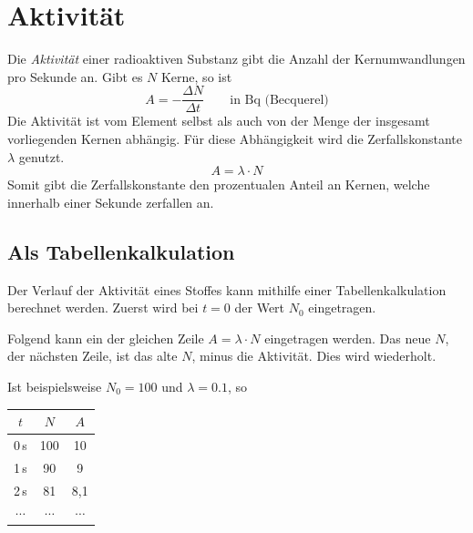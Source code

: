 \documentclass{article}
\begin{document}
\section{Aktivität}
Die \emph{Aktivität} einer radioaktiven Substanz gibt die Anzahl der Kernumwandlungen pro Sekunde an. Gibt es $N$ Kerne, so ist
\[
 A = -\frac{\Delta N}{\Delta t}
 \qquad \text{in Bq (Becquerel)} 
\] 
Die Aktivität ist vom Element selbst als auch von der Menge der insgesamt vorliegenden Kernen abhängig. Für diese Abhängigkeit wird die Zerfallskonstante $\lambda$ genutzt.
\[
 A = \lambda \cdot N 
\]
Somit gibt die Zerfallskonstante den prozentualen Anteil an Kernen, welche innerhalb einer Sekunde zerfallen an.
 
\subsection{Als Tabellenkalkulation}
Der Verlauf der Aktivität eines Stoffes kann mithilfe einer Tabellenkalkulation berechnet werden. Zuerst wird bei $t=0$ der Wert $N_0$ eingetragen.
 
Folgend kann ein der gleichen Zeile $A = \lambda \cdot N$ eingetragen werden. Das neue $N$, der nächsten Zeile, ist das alte $N$, minus die Aktivität. Dies wird wiederholt. 
 
Ist beispielsweise $N_0=100$ und $\lambda=0.1$, so
\begin{center}
 \begin{tabular}{ccc}
  $t$ & $N$ & $A$ \\
  \toprule
  0\,s & 100 & 10 \\
  1\,s & 90 & 9 \\
  2\,s & 81 & 8,1 \\
  $\cdots$ & $\cdots$ & $\cdots$ \\
  \bottomrule
 \end{tabular}
\end{center}  
\end{document}
